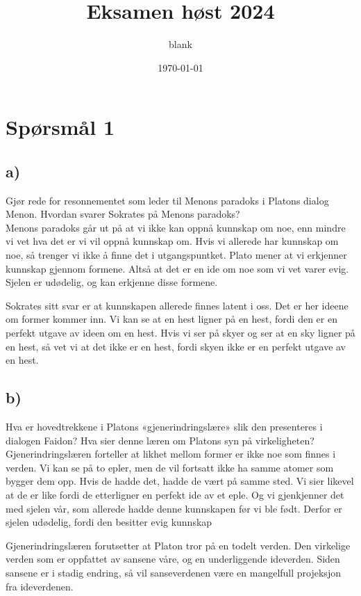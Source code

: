 \documentclass[12pt, a4paper]{article}
\title{Eksamen høst 2024}
\date{\today}
\author{blank}
\begin{document}
\maketitle


\section{Spørsmål 1}

\subsection{a)}

Gjør rede for resonnementet som leder til Menons paradoks i Platons dialog Menon.
Hvordan svarer Sokrates på Menons paradoks?\\

Menons paradoks går ut på at vi ikke kan oppnå kunnskap om noe, enn mindre vi vet hva det er vi vil oppnå kunnskap om. Hvis vi allerede har kunnskap om noe, så trenger vi ikke å finne det i utgangspuntket. Plato mener at vi erkjenner kunnskap gjennom formene. Altså at det er en ide om noe som vi vet varer evig. Sjelen er udødelig, og kan erkjenne disse formene. 

Sokrates sitt svar er at kunnskapen allerede finnes latent i oss. Det er her ideene om former kommer inn. Vi kan se at en hest ligner på en hest, fordi den er en perfekt utgave av ideen om en hest. Hvis vi ser på skyer og ser at en sky ligner på en hest, så vet vi at det ikke er en hest, fordi skyen ikke er en perfekt utgave av en hest.


\subsection{b)}
Hva er hovedtrekkene i Platons «gjenerindringslære» slik den presenteres i dialogen
Faidon? Hva sier denne læren om Platons syn på virkeligheten?\\

Gjenerindringslæren forteller at likhet mellom former er ikke noe som finnes i verden. Vi kan se på to epler, men de vil fortsatt ikke ha samme atomer som bygger dem opp. Hvis de hadde det, hadde de vært på samme sted. Vi sier likevel at de er like fordi de etterligner en perfekt ide av et eple. Og vi gjenkjenner det med sjelen vår, som allerede hadde denne kunnskapen før vi ble født. Derfor er sjelen udødelig, fordi den besitter evig kunnskap


Gjenerindringslæren forutsetter at Platon tror på en todelt verden. Den virkelige verden som er oppfattet av sansene våre, og en underliggende ideverden. Siden sansene er i stadig endring, så vil sanseverdenen være en mangelfull projeksjon fra ideverdenen.
\end{document}
